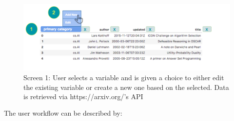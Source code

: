 \documentclass[12pt,letterpaper]{article}
\begin{document}
\begin{figure}[h]
\centering
\includegraphics[scale=.3]{figures/m3/wireframe-screen1.png}
\caption{Screen 1: User selects a variable and is given a choice to either edit the existing variable or create a new one based on the selected. Data is retrieved via https://arxiv.org/'s API}
\label{fig::2}
\end{figure}

The user workflow can be described by: 
\end{document}
